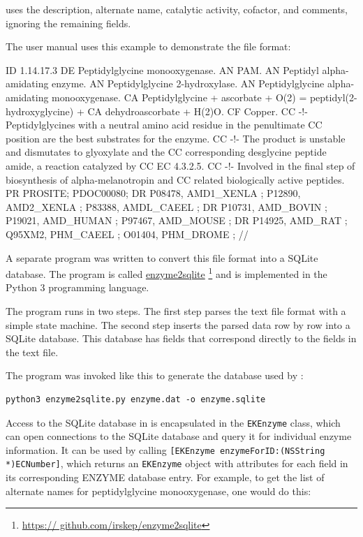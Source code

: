 \keggapp uses the description, alternate name, catalytic activity, cofactor, and
comments, ignoring the remaining fields.

The user manual uses this example to demonstrate the file format:

\begin{objc}
ID   1.14.17.3
DE   Peptidylglycine monooxygenase.
AN   PAM.
AN   Peptidyl alpha-amidating enzyme.
AN   Peptidylglycine 2-hydroxylase.
AN   Peptidylglycine alpha-amidating monooxygenase.
CA   Peptidylglycine + ascorbate + O(2) = peptidyl(2-hydroxyglycine) +
CA   dehydroascorbate + H(2)O.
CF   Copper.
CC   -!- Peptidylglycines with a neutral amino acid residue in the penultimate
CC       position are the best substrates for the enzyme.
CC   -!- The product is unstable and dismutates to glyoxylate and the
CC       corresponding desglycine peptide amide, a reaction catalyzed by
CC       EC 4.3.2.5.
CC   -!- Involved in the final step of biosynthesis of alpha-melanotropin and
CC       related biologically active peptides.
PR   PROSITE; PDOC00080;
DR   P08478, AMD1_XENLA ;  P12890, AMD2_XENLA ;  P83388, AMDL_CAEEL ;
DR   P10731, AMD_BOVIN  ;  P19021, AMD_HUMAN  ;  P97467, AMD_MOUSE  ;
DR   P14925, AMD_RAT    ;  Q95XM2, PHM_CAEEL  ;  O01404, PHM_DROME  ;
//
\end{objc}

A separate program was written to convert this file format into a SQLite
database. The program is called
\href{https://github.com/irskep/enzyme2sqlite}{enzyme2sqlite}
\footnote{\href{https://github.com/irskep/enzyme2sqlite}{https:/\slash
github.com\slash irskep\slash enzyme2sqlite}} and is implemented in the Python
3 programming language.

The program runs in two steps. The first step parses the text file format with a
simple state machine. The second step inserts the parsed data row by row
into a SQLite database. This database has fields that correspond directly to the
fields in the text file.

The program was invoked like this to generate the database used by \keggapp:

\begin{verbatim}
python3 enzyme2sqlite.py enzyme.dat -o enzyme.sqlite
\end{verbatim}

Access to the SQLite database in \keggapp is encapsulated in the
\texttt{EKEnzyme} class, which can open connections to the SQLite database and
query it for individual enzyme information. It can be used by calling
\texttt{[EKEnzyme enzymeForID:(NSString *)ECNumber]}, which returns an
\texttt{EKEnzyme} object with attributes for each field in its corresponding
ENZYME database entry. For example, to get the list of alternate names for
peptidylglycine monooxygenase, one would do this:

